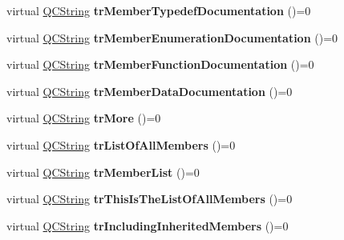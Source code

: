 \begin{DoxyCompactItemize}
\item 
\mbox{\label{class_translator_a381da0ae49e0801e0699b0e10b448d0b}} 
virtual \mbox{\hyperlink{class_q_c_string}{Q\+C\+String}} {\bfseries tr\+Member\+Typedef\+Documentation} ()=0
\item 
\mbox{\label{class_translator_aa327ece6b24bc5201a45a9fdee813556}} 
virtual \mbox{\hyperlink{class_q_c_string}{Q\+C\+String}} {\bfseries tr\+Member\+Enumeration\+Documentation} ()=0
\item 
\mbox{\label{class_translator_aaf453b274c90d92010dd4673e3cdae93}} 
virtual \mbox{\hyperlink{class_q_c_string}{Q\+C\+String}} {\bfseries tr\+Member\+Function\+Documentation} ()=0
\item 
\mbox{\label{class_translator_a7951a0dfe5173b444a0bf464148c5961}} 
virtual \mbox{\hyperlink{class_q_c_string}{Q\+C\+String}} {\bfseries tr\+Member\+Data\+Documentation} ()=0
\item 
\mbox{\label{class_translator_a739f39ac982745ec61d60bb8ed57bd6d}} 
virtual \mbox{\hyperlink{class_q_c_string}{Q\+C\+String}} {\bfseries tr\+More} ()=0
\item 
\mbox{\label{class_translator_ade3aeeb9d926bef235edea112a4aae3e}} 
virtual \mbox{\hyperlink{class_q_c_string}{Q\+C\+String}} {\bfseries tr\+List\+Of\+All\+Members} ()=0
\item 
\mbox{\label{class_translator_a00110754c6a4bf3250db05aeec9ce441}} 
virtual \mbox{\hyperlink{class_q_c_string}{Q\+C\+String}} {\bfseries tr\+Member\+List} ()=0
\item 
\mbox{\label{class_translator_a7d3db35076be3c4855bd784f02948583}} 
virtual \mbox{\hyperlink{class_q_c_string}{Q\+C\+String}} {\bfseries tr\+This\+Is\+The\+List\+Of\+All\+Members} ()=0
\item 
\mbox{\label{class_translator_a158a1104617de4cdbe589d2c2f678cb1}} 
virtual \mbox{\hyperlink{class_q_c_string}{Q\+C\+String}} {\bfseries tr\+Including\+Inherited\+Members} ()=0
\item 
\mbox{\label{class_translator_a9ab5205d45ae0dd1f71236f54560c21b}} 

\end{DoxyCompactItemize}
